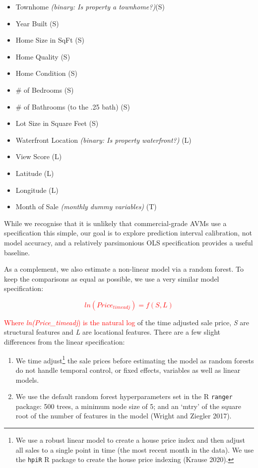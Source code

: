 \documentclass[colTwo]{anon}
\theoremstyle{definition}
\begin{document}
\begin{itemize}
\item Townhome \textit{(binary: Is property a townhome?)}(S)
\item Year Built (S)
\item Home Size in SqFt (S)
\item Home Quality (S)
\item Home Condition (S)
\item \# of Bedrooms (S)
\item \# of Bathrooms (to the .25 bath) (S)
\item Lot Size in Square Feet (S)
\item Waterfront Location \textit{(binary: Is property waterfront?)} (L)
\item View Score (L)
\item Latitude (L)
\item Longitude (L)
\item Month of Sale \textit{(monthly dummy variables)} (T) 
\end{itemize}

While we recognise that it is unlikely that commercial-grade AVMs use a specification this simple, our goal is to explore prediction interval calibration, not model accuracy, and a relatively parsimonious OLS specification provides a useful baseline.  

As a complement, we also estimate a non-linear model via a random forest.  To keep the comparisons as equal as possible, we use a very similar model specification:

\textcolor{red}{\[ln(Price_{timeadj}) = f(S, L) \]}

\textcolor{red}{Where \textit{ln(Price\_timeadj}) is the natural log} of the time adjusted sale price, \textit{S} are structural features and \textit{L} are locational features. There are a few slight differences from the linear specification:

\begin{enumerate}
\item We time adjust\footnote{We use a robust linear model to create a house price index and then adjust all sales to a single point in time (the most recent month in the data).  We use the \texttt{hpiR} R package to create the house price indexing (Krause 2020).} the sale prices before estimating the model as random forests do not handle temporal control, or fixed effects, variables as well as linear models. 
\item We use the default random forest hyperparameters set in the R \texttt{ranger} package: 500 trees, a minimum node size of 5; and an ‘mtry’ of the square root of the number of features in the model (Wright and Ziegler 2017). 
\end{enumerate}
\end{document}
